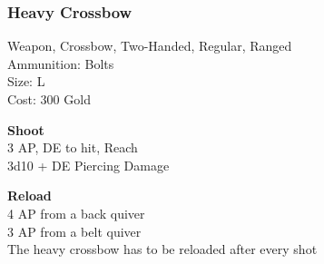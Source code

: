 \subsubsection{Heavy Crossbow}\label{weapon:heavyCrossbow}
Weapon, Crossbow, Two-Handed, Regular, Ranged\\
Ammunition: Bolts\\
Size: L\\
Cost: 300 Gold

\textbf{Shoot} \\
3 AP, DE to hit,  Reach\\
3d10 + \texttimes DE Piercing Damage

\textbf{Reload} \\
4 AP from a back quiver\\
3 AP from a belt quiver\\
The heavy crossbow has to be reloaded after every shot

